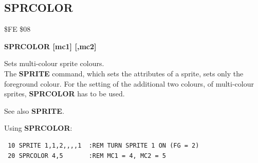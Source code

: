 \subsection{SPRCOLOR}
\begin{description}[leftmargin=2cm,style=nextline]
\item [Token:] \$FE \$08
\item [Format:] {\bf SPRCOLOR [mc1] [,mc2]}
\item [Usage:]  Sets multi-colour sprite colours. \\
                The {\bf SPRITE} command, which sets the
                attributes of a sprite, sets only the foreground
                colour. For the setting of the  additional two colours,
                of multi-colour sprites, {\bf SPRCOLOR} has
                to be used.

\item [Remarks:] See also {\bf SPRITE}.

\item [Example:] Using {\bf SPRCOLOR}:
\begin{tcolorbox}[colback=black,coltext=white]
\verbatimfont{\codefont}
\begin{verbatim}
 10 SPRITE 1,1,2,,,,1  :REM TURN SPRITE 1 ON (FG = 2)
 20 SPRCOLOR 4,5       :REM MC1 = 4, MC2 = 5
\end{verbatim}
\end{tcolorbox}
\end{description}


\newpage
